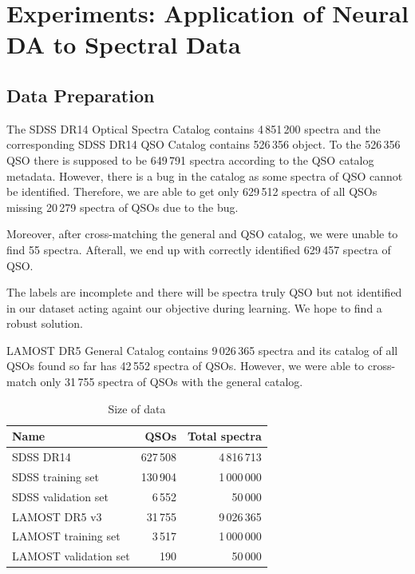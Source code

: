\chapter{Experiments: Application of Neural DA to Spectral Data}
\label{exp_chapter}

\section{Data Preparation}

The SDSS DR14 Optical Spectra Catalog contains 4\,851\,200 spectra
and the corresponding SDSS DR14 QSO Catalog contains 526\,356 object.
To the 526\,356 QSO there is supposed to be 649\,791 spectra
according to the QSO catalog metadata.
However, there is a bug in the catalog as some spectra of QSO cannot be identified.
Therefore, we are able to get only 629\,512 spectra of all QSOs
missing 20\,279 spectra of QSOs due to the bug.

Moreover, after cross-matching the general and QSO catalog,
we were unable to find 55 spectra.
Afterall, we end up with correctly identified 629\,457 spectra of QSO.

The labels are incomplete and there will be spectra truly QSO
but not identified in our dataset
acting againt our objective during learning.
We hope to find a robust solution.

LAMOST DR5 General Catalog contains 9\,026\,365 spectra
and its catalog of all QSOs found so far has 42\,552 spectra of QSOs.
However, we were able to cross-match only 31\,755 spectra of QSOs with the general catalog.

\begin{table}
	\begin{center}
	\begin{tabular}{|l|r|r|}
		\hline
		Name & QSOs & Total spectra \\ \hline \hline
		SDSS DR14 & 627\,508 & 4\,816\,713 \\ \hline
		SDSS training set & 130\,904 & 1\,000\,000 \\ \hline
		SDSS validation set & 6\,552 & 50\,000 \\ \hline
		LAMOST DR5 v3 & 31\,755 & 9\,026\,365 \\ \hline
		LAMOST training set & 3\,517 & 1\,000\,000 \\ \hline
		LAMOST validation set & 190 & 50\,000 \\ \hline
	\end{tabular}
	\end{center}
	\caption{Size of data}
\end{table}

